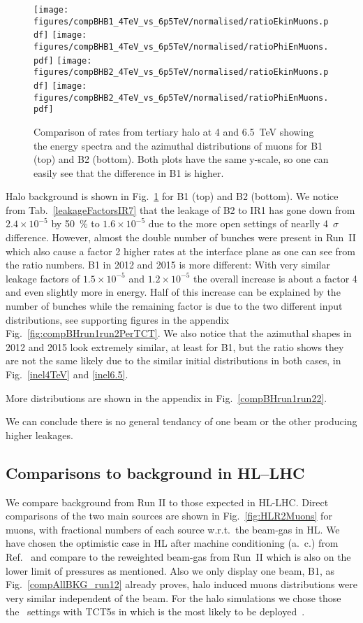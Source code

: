 \begin{figure}
\centering
  \texttt{[image: figures/compBHB1\_4TeV\_vs\_6p5TeV/normalised/ratioEkinMuons.pdf]}
  \texttt{[image: figures/compBHB1\_4TeV\_vs\_6p5TeV/normalised/ratioPhiEnMuons.pdf]}
  \texttt{[image: figures/compBHB2\_4TeV\_vs\_6p5TeV/normalised/ratioEkinMuons.pdf]}
  \texttt{[image: figures/compBHB2\_4TeV\_vs\_6p5TeV/normalised/ratioPhiEnMuons.pdf]}
 \caption{Comparison of rates from tertiary halo at 4 and 6.5~TeV showing the energy spectra and the azimuthal distributions of muons for B1 (top) and B2 (bottom). Both plots have the same y-scale, so one can easily see that the difference in B1 is higher.
  \label{fig:compBHrun1run2}}
\end{figure}

Halo background is shown in Fig.~\ref{fig:compBHrun1run2} for B1 (top) and B2 (bottom). We notice from Tab.~\ref{leakageFactorsIR7} that the leakage of B2 to IR1 has gone down from $2.4 \times 10^{-5}$ by 50~\% to $1.6 \times 10^{-5}$ due to the more open settings of nearlly 4~$\sigma$ difference. However, almost the double number of bunches were present in Run~II which also cause a factor 2 higher rates at the interface plane as one can see from the ratio numbers. B1 in 2012 and 2015 is more different: With very similar leakage factors of $1.5 \times 10^{-5}$ and $1.2 \times 10^{-5}$ the overall increase is about a factor 4 and even slightly more in energy. Half of this increase can be explained by the number of bunches while the remaining factor is due to the two different input distributions, see supporting figures in the appendix Fig.~\ref{fig:compBHrun1run2PerTCT}. We also notice that the azimuthal shapes in 2012 and 2015 look extremely similar, at least for B1, but the ratio shows they are not the same likely due to the similar initial distributions in both cases, in Fig.~\ref{inel4TeV} and \ref{inel6.5}.

More distributions are shown in the appendix in Fig.~\ref{compBHrun1run22}.

We can conclude there is no general tendancy of one beam or the other producing higher leakages. 

\subsection{Comparisons to background in HL--LHC}


We compare background from Run II to those expected in HL-LHC. Direct comparisons of the two main sources are shown in Fig.~\ref{fig:HLR2Muons} for muons, with fractional numbers of each source w.r.t.~the beam-gas in HL. We have chosen the optimistic case in HL after machine conditioning (a.~c.) from Ref.~\cite{ipac2015_rkh} and compare to the reweighted beam-gas from Run~II which is also on the lower limit of pressures as mentioned. Also we only display one beam, B1, as Fig.~\ref{compAllBKG_run12} already proves, halo induced muons distributions were very similar independent of the beam. For the halo simulations we chose those the \twosigmaret~settings with TCT5s in which is the most likely to be deployed~\cite{layoutProcRod}.

